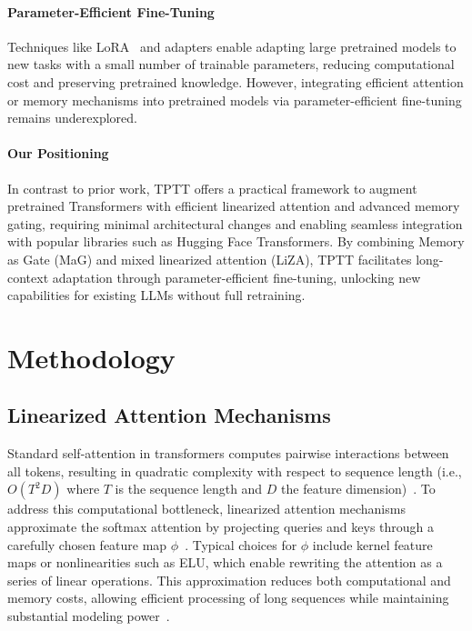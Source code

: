 \documentclass[10pt,a4paper]{article}
\begin{document}
\paragraph{Parameter-Efficient Fine-Tuning}  
Techniques like LoRA~\cite{hu2022lora} and adapters enable adapting large pretrained models to new tasks with a small number of trainable parameters, reducing computational cost and preserving pretrained knowledge. However, integrating efficient attention or memory mechanisms into pretrained models via parameter-efficient fine-tuning remains underexplored.

\paragraph{Our Positioning}  
In contrast to prior work, TPTT offers a practical framework to augment pretrained Transformers with efficient linearized attention and advanced memory gating, requiring minimal architectural changes and enabling seamless integration with popular libraries such as Hugging Face Transformers. By combining Memory as Gate (MaG) and mixed linearized attention (LiZA), TPTT facilitates long-context adaptation through parameter-efficient fine-tuning, unlocking new capabilities for existing LLMs without full retraining.


\section{Methodology}

\subsection{Linearized Attention Mechanisms}

Standard self-attention in transformers computes pairwise interactions between all tokens, resulting in quadratic complexity with respect to sequence length (i.e., $O(T^2 D)$ where $T$ is the sequence length and $D$ the feature dimension)~\cite{vaswani2017attention}. To address this computational bottleneck, linearized attention mechanisms approximate the softmax attention by projecting queries and keys through a carefully chosen feature map $\phi$~\cite{katharopoulos2020transformers, wang2020linformer, mercat2024linearizing, yang2024parallelizing}. Typical choices for $\phi$ include kernel feature maps or nonlinearities such as ELU, which enable rewriting the attention as a series of linear operations. This approximation reduces both computational and memory costs, allowing efficient processing of long sequences while maintaining substantial modeling power~\cite{gu2023mamba, dao2023flashattention, zhang2024lolcats, lan2025liger}.
\end{document}
